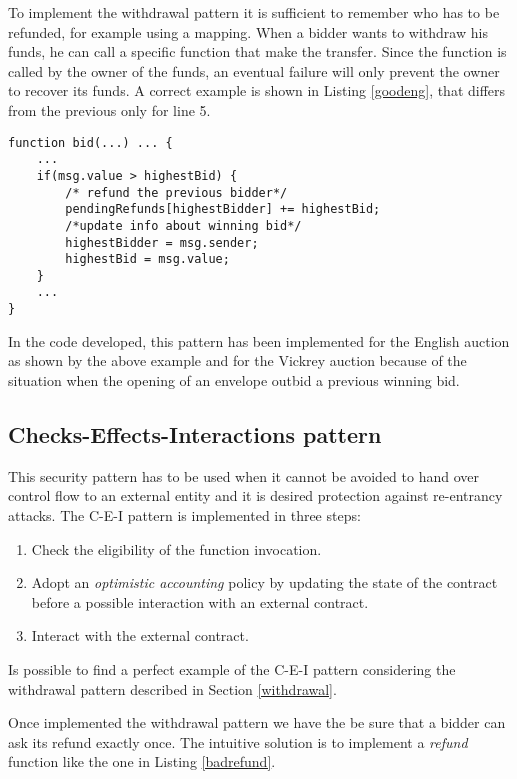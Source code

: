 \documentclass{article}
\begin{document}
To implement the withdrawal pattern it is sufficient to remember who has to be refunded, for example using a mapping. When a bidder wants to withdraw his funds, he can call a specific function that make the transfer. Since the function is called by the owner of the funds, an eventual failure will only prevent the owner to recover its funds. A correct example is shown in Listing \ref{goodeng}, that differs from the previous only for line 5.

\begin{lstlisting}[language=Solidity, caption={Correct code that do use the withdrawal pattern},captionpos=b, label=goodeng]
 function bid(...) ... {
    ...
    if(msg.value > highestBid) {
        /* refund the previous bidder*/
        pendingRefunds[highestBidder] += highestBid;
        /*update info about winning bid*/
        highestBidder = msg.sender;
        highestBid = msg.value;
    }
    ...   
}
\end{lstlisting}

In the code developed, this pattern has been implemented for the English auction as shown by the above example and for the Vickrey auction because of the situation when the opening of an envelope outbid a previous winning bid.  

\subsection{Checks-Effects-Interactions pattern}\label{CEIpattern}
This security pattern has to be used when it cannot be avoided to hand over control flow to an external entity and it is desired protection against re-entrancy attacks. The C-E-I pattern is implemented in three steps:
\begin{enumerate}
    \item Check the eligibility of the function invocation.
    \item Adopt an \textit{optimistic accounting} policy by updating the state of the contract before a possible interaction with an external contract.
    \item Interact with the external contract.
\end{enumerate}
Is possible to find a perfect example of the C-E-I pattern considering the withdrawal pattern described in Section \ref{withdrawal}.

Once implemented the withdrawal pattern we have the be sure that a bidder can ask its refund exactly once. The intuitive solution is to implement a \textit{refund} function like the one in Listing \ref{badrefund}.
\end{document}
